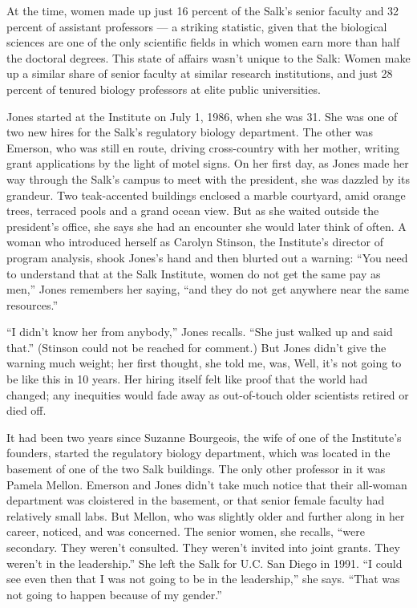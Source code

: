 At the time, women made up just 16 percent of the Salk's senior faculty
and 32 percent of assistant professors --- a striking statistic, given
that the biological sciences are one of the only scientific fields in
which women earn more than half the doctoral degrees. This state of
affairs wasn't unique to the Salk: Women make up a similar share of
senior faculty at similar research institutions, and just 28 percent of
tenured biology professors at elite public universities.

Jones started at the Institute on July 1, 1986, when she was 31. She was
one of two new hires for the Salk's regulatory biology department. The
other was Emerson, who was still en route, driving cross-country with
her mother, writing grant applications by the light of motel signs. On
her first day, as Jones made her way through the Salk's campus to meet
with the president, she was dazzled by its grandeur. Two teak-accented
buildings enclosed a marble courtyard, amid orange trees, terraced pools
and a grand ocean view. But as she waited outside the president's
office, she says she had an encounter she would later think of often. A
woman who introduced herself as Carolyn Stinson, the Institute's
director of program analysis, shook Jones's hand and then blurted out a
warning: ``You need to understand that at the Salk Institute, women do
not get the same pay as men,'' Jones remembers her saying, ``and they do
not get anywhere near the same resources.''

``I didn't know her from anybody,'' Jones recalls. ``She just walked up
and said that.'' (Stinson could not be reached for comment.) But Jones
didn't give the warning much weight; her first thought, she told me,
was, Well, it's not going to be like this in 10 years. Her hiring itself
felt like proof that the world had changed; any inequities would fade
away as out-of-touch older scientists retired or died off.

It had been two years since Suzanne Bourgeois, the wife of one of the
Institute's founders, started the regulatory biology department, which
was located in the basement of one of the two Salk buildings. The only
other professor in it was Pamela Mellon. Emerson and Jones didn't take
much notice that their all-woman department was cloistered in the
basement, or that senior female faculty had relatively small labs. But
Mellon, who was slightly older and further along in her career, noticed,
and was concerned. The senior women, she recalls, ``were secondary. They
weren't consulted. They weren't invited into joint grants. They weren't
in the leadership.'' She left the Salk for U.C. San Diego in 1991. ``I
could see even then that I was not going to be in the leadership,'' she
says. ``That was not going to happen because of my gender.''

